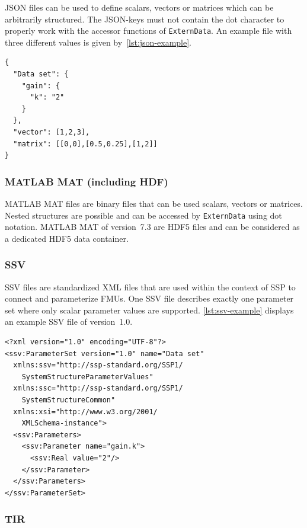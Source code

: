 \documentclass{modelica}
\newcommand{\modelica}[1]{\lstinline[language=modelica]|#1|}
\begin{document}
JSON files can be used to define scalars, vectors or matrices which can be arbitrarily structured.
The JSON-keys must not contain the dot character to properly work with the accessor functions of \modelica{ExternData}.
An example file with three different values is given by~\autoref{lst:json-example}.

\begin{lstlisting}[caption=Example JSON file, label=lst:json-example]
{
  "Data set": {
    "gain": {
      "k": "2"
    }
  },
  "vector": [1,2,3],
  "matrix": [[0,0],[0.5,0.25],[1,2]]
}
\end{lstlisting}

\subsubsection*{MATLAB MAT (including HDF)}

MATLAB MAT files are binary files that can be used scalars, vectors or matrices.
Nested structures are possible and can be accessed by \modelica{ExternData} using dot notation.
MATLAB MAT of version~7.3 are HDF5 files and can be considered as a dedicated HDF5 data container.

\subsubsection*{SSV}

SSV files are standardized XML files that are used within the context of SSP to connect and parameterize FMUs.
One SSV file describes exactly one parameter set where only scalar parameter values are supported.
\autoref{lst:ssv-example} displays an example SSV file of version~1.0.

\begin{lstlisting}[caption=Example SSV file, label=lst:ssv-example]
<?xml version="1.0" encoding="UTF-8"?>
<ssv:ParameterSet version="1.0" name="Data set"
  xmlns:ssv="http://ssp-standard.org/SSP1/
    SystemStructureParameterValues"
  xmlns:ssc="http://ssp-standard.org/SSP1/
    SystemStructureCommon"
  xmlns:xsi="http://www.w3.org/2001/
    XMLSchema-instance">
  <ssv:Parameters>
    <ssv:Parameter name="gain.k">
      <ssv:Real value="2"/>
    </ssv:Parameter>
  </ssv:Parameters>
</ssv:ParameterSet>
\end{lstlisting}

\subsubsection*{TIR}
\end{document}
